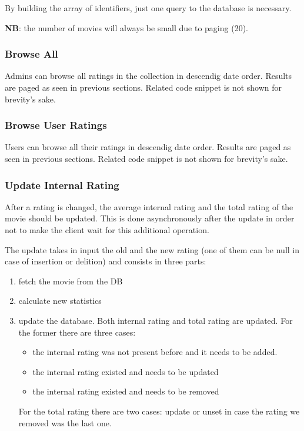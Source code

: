 \documentclass[11pt]{article}
\begin{document}
By building the array of identifiers, just one query to the database is necessary.

\textbf{NB}: the number of movies will always be small due to paging (20).



\subsubsection{Browse All}
Admins can browse all ratings in the collection in descendig date order. Results are paged as seen in previous sections. Related code snippet is not shown for brevity's sake.

\subsubsection{Browse User Ratings}
Users can browse all their ratings in descendig date order. Results are paged as seen in previous sections. Related code snippet is not shown for brevity's sake.

\subsubsection{Update Internal Rating}
\label{sssec:updateInternalRating}
After a rating is changed, the average internal rating and the total rating of the movie should be updated. This is done asynchronously after the update in order not to make the client wait for this additional operation.

The update takes in input the old and the new rating (one of them can be null in case of insertion or delition) and consists in three parts:
\begin{enumerate}
	\item fetch the movie from the DB
	\item calculate new statistics
	\item update the database. Both internal rating and total rating are updated. For the former there are three cases:
	\begin{itemize}
		\item the internal rating was not present before and it needs to be added.
		\item the internal rating existed and needs to be updated
		\item the internal rating existed and needs to be removed
	\end{itemize}
	For the total rating there are two cases: update or unset in case the rating we removed was the last one.		
\end{enumerate}
\end{document}
